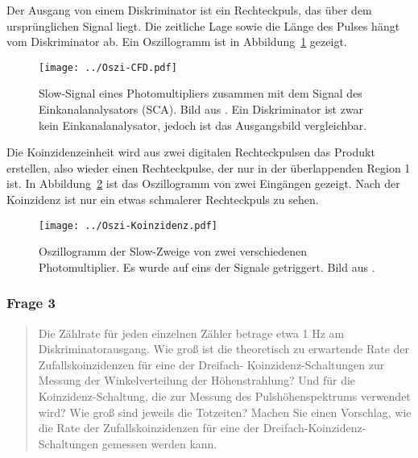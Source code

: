 \documentclass[11pt, ngerman, fleqn, DIV=15, headinclude, BCOR=2cm]{scrreprt}
\begin{document}
Der Ausgang von einem Diskriminator ist ein Rechteckpuls, das über dem
ursprünglichen Signal liegt. Die zeitliche Lage sowie die Länge des Pulses
hängt vom Diskriminator ab. Ein Oszillogramm ist in
Abbildung~\ref{fig:oszi-cfd} gezeigt.

\begin{figure}[htbp]
    \centering
    \texttt{[image: ../Oszi-CFD.pdf]}
    \caption{%
        Slow-Signal eines Photomultipliers zusammen mit dem
        Signal des Einkanalanalysators (SCA). Bild aus
        \parencite[Abbildung~2.8]{Ueding/525}. Ein Diskriminator ist zwar kein
        Einkanalanalysator, jedoch ist das Ausgangsbild vergleichbar.
    }
    \label{fig:oszi-cfd}
\end{figure}

Die Koinzidenzeinheit wird aus zwei digitalen Rechteckpulsen das Produkt
erstellen, also wieder einen Rechteckpulse, der nur in der überlappenden Region
1 ist. In Abbildung~\ref{fig:oszi-koinzidenz} ist das Oszillogramm von zwei
Eingängen gezeigt. Nach der Koinzidenz ist nur ein etwas schmalerer
Rechteckpuls zu sehen.

\begin{figure}[htbp]
    \centering
    \texttt{[image: ../Oszi-Koinzidenz.pdf]}
    \caption{%
        Oszillogramm der Slow-Zweige von zwei verschiedenen Photomultiplier. Es
        wurde auf eins der Signale getriggert. Bild aus
        \parencite[Abbildung~2.24]{Ueding/525}.
    }
    \label{fig:oszi-koinzidenz}
\end{figure}


\subsubsection{Frage 3}

\begin{quote}
    Die Zählrate für jeden einzelnen Zähler betrage etwa 1 Hz am
    Diskriminatorausgang. Wie groß ist die theoretisch zu erwartende Rate der
    Zufallskoinzidenzen für eine der Dreifach- Koinzidenz-Schaltungen zur
    Messung der Winkelverteilung der Höhenstrahlung? Und für die
    Koinzidenz-Schaltung, die zur Messung des Pulshöhenspektrums verwendet
    wird? Wie groß sind jeweils die Totzeiten? Machen Sie einen Vorschlag, wie
    die Rate der Zufallskoinzidenzen für eine der
    Dreifach-Koinzidenz-Schaltungen gemessen werden kann.
\end{quote}
\end{document}
